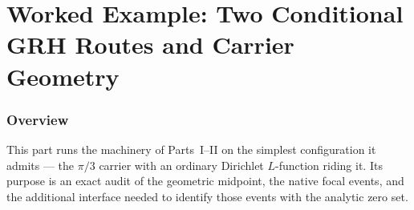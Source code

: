 
\part{Worked Example: Two Conditional GRH Routes and Carrier Geometry}\label{part:grh}

\section{Overview}\label{sec:grh-overview}

This part runs the machinery of Parts~I--II on the simplest configuration it
admits --- the \(\pi/3\) carrier with an ordinary Dirichlet \(L\)-function
riding it.  Its purpose is an exact audit of the geometric midpoint, the
native focal events, and the additional interface needed to identify those
events with the analytic zero set.

